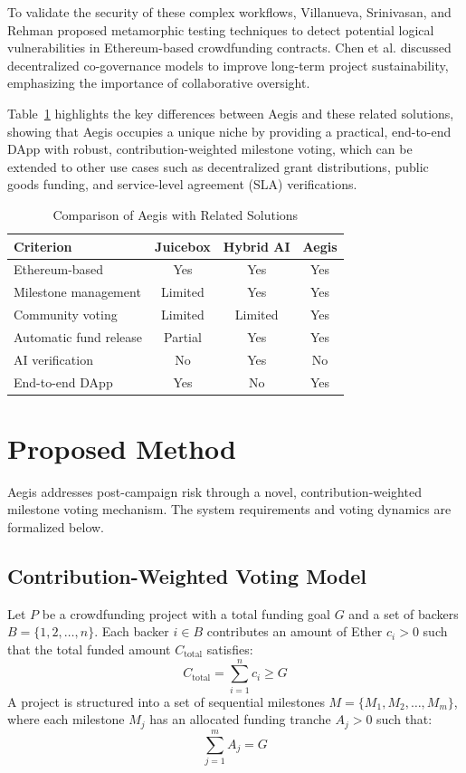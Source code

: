 \documentclass[conference]{IEEEtran}
\begin{document}
To validate the security of these complex workflows, Villanueva, Srinivasan, and Rehman \cite{villanueva2025metamorphic} proposed metamorphic testing techniques to detect potential logical vulnerabilities in Ethereum-based crowdfunding contracts. Chen et al. \cite{chen2023dcc} discussed decentralized co-governance models to improve long-term project sustainability, emphasizing the importance of collaborative oversight.

Table~\ref{tab:comparison} highlights the key differences between Aegis and these related solutions, showing that Aegis occupies a unique niche by providing a practical, end-to-end DApp with robust, contribution-weighted milestone voting, which can be extended to other use cases such as decentralized grant distributions, public goods funding, and service-level agreement (SLA) verifications.

\begin{table}[t]
\centering
\caption{Comparison of Aegis with Related Solutions}
\label{tab:comparison}
\begin{tabular}{lccc}
\toprule
\textbf{Criterion} & \textbf{Juicebox \cite{juicebox}} & \textbf{Hybrid AI \cite{hybridai}} & \textbf{Aegis} \\
\midrule
Ethereum-based & Yes & Yes & Yes \\
Milestone management & Limited & Yes & Yes \\
Community voting & Limited & Limited & Yes \\
Automatic fund release & Partial & Yes & Yes \\
AI verification & No & Yes & No \\
End-to-end DApp & Yes & No & Yes \\
\bottomrule
\end{tabular}
\end{table}

\section{Proposed Method}
Aegis addresses post-campaign risk through a novel, contribution-weighted milestone voting mechanism. The system requirements and voting dynamics are formalized below.

\subsection{Contribution-Weighted Voting Model}
Let $P$ be a crowdfunding project with a total funding goal $G$ and a set of backers $B = \{1, 2, \dots, n\}$. Each backer $i \in B$ contributes an amount of Ether $c_i > 0$ such that the total funded amount $C_{\text{total}}$ satisfies:
\begin{equation}
C_{\text{total}} = \sum_{i=1}^{n} c_i \ge G
\end{equation}
A project is structured into a set of sequential milestones $M = \{M_1, M_2, \dots, M_m\}$, where each milestone $M_j$ has an allocated funding tranche $A_j > 0$ such that:
\begin{equation}
\sum_{j=1}^{m} A_j = G
\end{equation}
\end{document}

